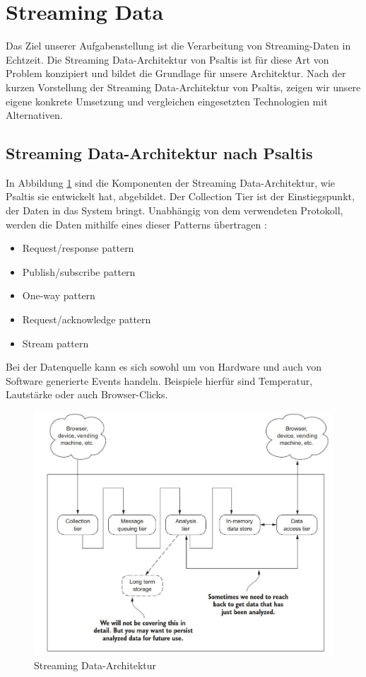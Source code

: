 \section{Streaming Data}

Das Ziel unserer Aufgabenstellung ist die Verarbeitung von Streaming-Daten in Echtzeit. Die Streaming Data-Architektur
von Psaltis \cite{psaltis2017streaming} ist für diese Art von Problem konzipiert und bildet die Grundlage für
unsere Architektur. Nach der kurzen Vorstellung der Streaming Data-Architektur von Psaltis, zeigen wir unsere eigene konkrete
Umsetzung und vergleichen eingesetzten Technologien mit Alternativen.

\subsection{Streaming Data-Architektur nach Psaltis}

In Abbildung \ref{fig:streaming_data_architecture-psaltis} sind die Komponenten der Streaming Data-Architektur, wie Psaltis \cite{psaltis2017streaming}
sie entwickelt hat, abgebildet. Der Collection Tier ist der Einstiegspunkt, der Daten in das System bringt. Unabhängig von dem verwendeten
Protokoll, werden die Daten mithilfe eines dieser Patterns übertragen \cite{psaltis2017streaming}:
\begin{itemize}
    \item Request/response pattern
    \item Publish/subscribe pattern
    \item One-way pattern
    \item Request/acknowledge pattern
    \item Stream pattern
\end{itemize}

Bei der Datenquelle kann es sich sowohl um von Hardware und auch von Software generierte Events handeln. Beispiele hierfür sind
Temperatur, Lautstärke oder auch Browser-Clicks.

\begin{figure}[h]
    \includegraphics[width=.5\textwidth]{images/streaming_data_architecture-psaltis.jpg}
    \caption{Streaming Data-Architektur \cite{psaltis2017streaming}}
    \label{fig:streaming_data_architecture-psaltis}
\end{figure}

